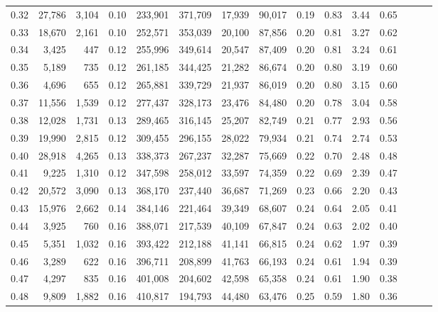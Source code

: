 \begin{tabular}{rrrrrrrrrrrrrrr}
0.32 &  27,786 &  3,104 &  0.10 &  233,901 &  371,709 &   17,939 &   90,017 &  0.19 &  0.83 &  3.44 &      0.65 \\
0.33 &  18,670 &  2,161 &  0.10 &  252,571 &  353,039 &   20,100 &   87,856 &  0.20 &  0.81 &  3.27 &      0.62 \\
0.34 &   3,425 &    447 &  0.12 &  255,996 &  349,614 &   20,547 &   87,409 &  0.20 &  0.81 &  3.24 &      0.61 \\
0.35 &   5,189 &    735 &  0.12 &  261,185 &  344,425 &   21,282 &   86,674 &  0.20 &  0.80 &  3.19 &      0.60 \\
0.36 &   4,696 &    655 &  0.12 &  265,881 &  339,729 &   21,937 &   86,019 &  0.20 &  0.80 &  3.15 &      0.60 \\
0.37 &  11,556 &  1,539 &  0.12 &  277,437 &  328,173 &   23,476 &   84,480 &  0.20 &  0.78 &  3.04 &      0.58 \\
0.38 &  12,028 &  1,731 &  0.13 &  289,465 &  316,145 &   25,207 &   82,749 &  0.21 &  0.77 &  2.93 &      0.56 \\
0.39 &  19,990 &  2,815 &  0.12 &  309,455 &  296,155 &   28,022 &   79,934 &  0.21 &  0.74 &  2.74 &      0.53 \\
0.40 &  28,918 &  4,265 &  0.13 &  338,373 &  267,237 &   32,287 &   75,669 &  0.22 &  0.70 &  2.48 &      0.48 \\
0.41 &   9,225 &  1,310 &  0.12 &  347,598 &  258,012 &   33,597 &   74,359 &  0.22 &  0.69 &  2.39 &      0.47 \\
0.42 &  20,572 &  3,090 &  0.13 &  368,170 &  237,440 &   36,687 &   71,269 &  0.23 &  0.66 &  2.20 &      0.43 \\
0.43 &  15,976 &  2,662 &  0.14 &  384,146 &  221,464 &   39,349 &   68,607 &  0.24 &  0.64 &  2.05 &      0.41 \\
0.44 &   3,925 &    760 &  0.16 &  388,071 &  217,539 &   40,109 &   67,847 &  0.24 &  0.63 &  2.02 &      0.40 \\
0.45 &   5,351 &  1,032 &  0.16 &  393,422 &  212,188 &   41,141 &   66,815 &  0.24 &  0.62 &  1.97 &      0.39 \\
0.46 &   3,289 &    622 &  0.16 &  396,711 &  208,899 &   41,763 &   66,193 &  0.24 &  0.61 &  1.94 &      0.39 \\
0.47 &   4,297 &    835 &  0.16 &  401,008 &  204,602 &   42,598 &   65,358 &  0.24 &  0.61 &  1.90 &      0.38 \\
0.48 &   9,809 &  1,882 &  0.16 &  410,817 &  194,793 &   44,480 &   63,476 &  0.25 &  0.59 &  1.80 &      0.36 \\

\end{tabular}
